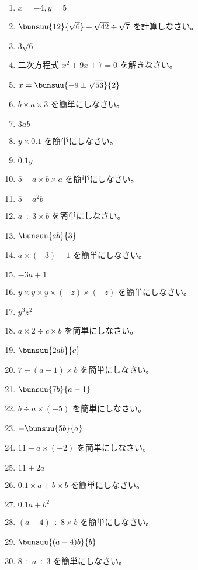 \documentclass[uplatex,a4j,11pt]{jsreport}
\begin{document}
\begin{multicols}{2}
\begin{enumerate}
    \item $x=-4, y=5$
    \item $\bunsuu{12}{\sqrt{6}}+\sqrt{42}\div\sqrt{7}$ を計算しなさい。%
    \item $3\sqrt{6}$
    \item 二次方程式 $x^2+9x+7=0$ を解きなさい。%
    \item $x=\bunsuu{-9\pm\sqrt{53}}{2}$
    \item $b \times a \times 3$ を簡単にしなさい。%
    \item $3ab$
    \item $y \times 0.1$ を簡単にしなさい。%
    \item $0.1y$
    \item $5-a \times b \times a$ を簡単にしなさい。%
    \item $5-a^2b$
    \item $a \div 3 \times b$ を簡単にしなさい。%
    \item $\bunsuu{ab}{3}$
    \item $a \times (-3) + 1$ を簡単にしなさい。%
    \item $-3a+1$
    \item $y \times y \times y \times (-z) \times (-z)$ を簡単にしなさい。%
    \item $y^3z^2$
    \item $a \times 2 \div c \times b$ を簡単にしなさい。%
    \item $\bunsuu{2ab}{c}$
    \item $7 \div (a - 1) \times b$ を簡単にしなさい。%
    \item $\bunsuu{7b}{a-1}$
    \item $b \div a \times (-5)$ を簡単にしなさい。%
    \item $-\bunsuu{5b}{a}$
    \item $11-a\times(-2)$ を簡単にしなさい。%
    \item $11+2a$
    \item $0.1 \times a + b \times b$ を簡単にしなさい。%
    \item $0.1a+b^2$
    \item $(a - 4) \div 8 \times b$ を簡単にしなさい。%
    \item $\bunsuu{(a-4)b}{b}$
    \item $8 \div a \div 3$ を簡単にしなさい。%

\end{enumerate}
\end{multicols}
\end{document}
